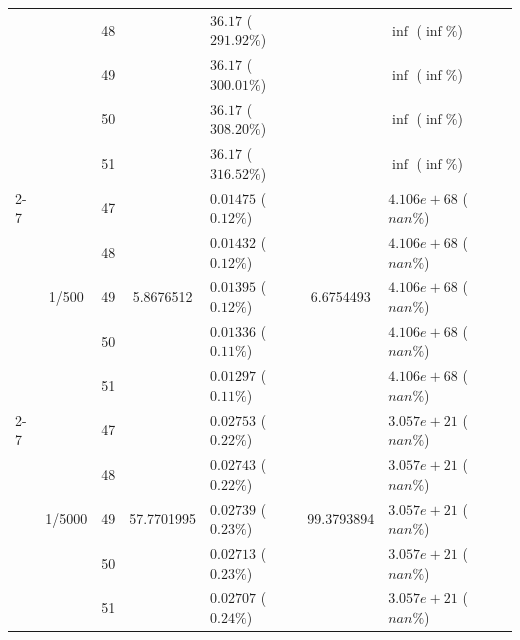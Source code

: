 \begin{table}[htbp]
{\begin{tabular}{lclclclc}
    &                         & 48 &                           & $36.17$ ($291.92\%$)     &                           & $\inf$ ($\inf\%$)   \\
    &                         & 49 &                           & $36.17$ ($300.01\%$)    &                           & $\inf$ ($\inf\%$)     \\
    &                         & 50 &                           & $36.17$ ($308.20\%$)    &                           & $\inf$ ($\inf\%$)     \\
    &                         & 51 &                           & $36.17$ ($316.52\%$)    &                           & $\inf$ ($\inf\%$)     \\
    \cmidrule(lr){2-7}
    & \multirow{5}{*}{1/500} & 47 & \multirow{5}{*}{5.8676512}  & $0.01475$ ($0.12\%$)  & \multirow{5}{*}{6.6754493} & $4.106e+68$ ($nan\%$)   \\
    &                         & 48 &                           & $0.01432$ ($0.12\%$)   &                           & $4.106e+68$ ($nan\%$)    \\
    &                         & 49  &                           & $0.01395$ ($0.12\%$)   &                           & $4.106e+68$ ($nan\%$)   \\
    &                         & 50 &                           & $0.01336$ ($0.11\%$)   &                           & $4.106e+68$ ($nan\%$)     \\
    &                         & 51 &                           & $0.01297$ ($0.11\%$)    &                           & $4.106e+68$ ($nan\%$)   \\
    \cmidrule(lr){2-7}
    & \multirow{5}{*}{1/5000}& 47 & \multirow{5}{*}{57.7701995}& $0.02753$ ($0.22\%$)  & \multirow{5}{*}{99.3793894} & $3.057e+21$ ($nan\%$)   \\
    &                         & 48 &                           & $0.02743$ ($0.22\%$)   &                           & $3.057e+21$ ($nan\%$)    \\
    &                         & 49  &                           & $0.02739$ ($0.23\%$)   &                           & $3.057e+21$ ($nan\%$)   \\
    &                         & 50 &                           & $0.02713$ ($0.23\%$)   &                           & $3.057e+21$ ($nan\%$)     \\
    &                         & 51 &                           & $0.02707$ ($0.24\%$)    &                           & $3.057e+21$ ($nan\%$)   \\

\end{tabular}}
\end{table}
